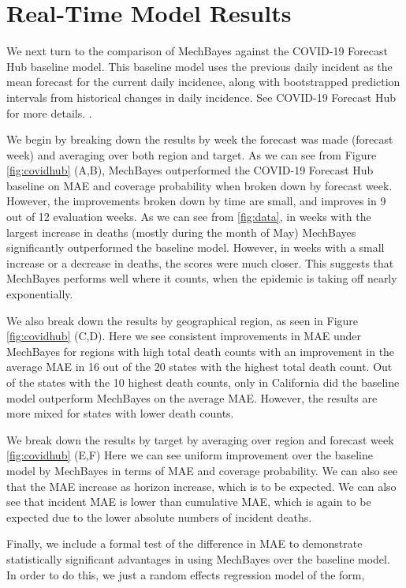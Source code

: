 \documentclass{umassthesis}          %
\begin{document}
\section{Real-Time Model Results}

We next turn to the comparison of MechBayes against the COVID-19 Forecast Hub baseline model. This baseline model uses the previous daily incident as the mean forecast for the current daily incidence, along with  bootstrapped prediction intervals from historical changes in daily incidence. See COVID-19 Forecast Hub for more details. \cite{covidhub}. 

We begin by breaking down the results by week the forecast was made (forecast week) and averaging over both region and target. As we can see from Figure \ref{fig:covidhub} (A,B), MechBayes outperformed the COVID-19 Forecast Hub baseline on MAE and coverage probability when broken down by forecast week. However, the improvements broken down by time are small, and improves in 9 out of 12 evaluation weeks.  As we can see from \ref{fig:data}, in weeks with the largest increase in deaths (mostly during the month of May) MechBayes significantly outperformed the baseline model. However, in weeks with a small increase or a decrease in deaths, the scores were much closer. This suggests that MechBayes performs well where it counts, when the epidemic is taking off nearly exponentially. 

We also break down the results by geographical region, as seen in Figure \ref{fig:covidhub} (C,D). Here we see consistent improvements in MAE under MechBayes for regions with high total death counts with an improvement in the average MAE in 16 out of the 20 states with the highest total death count. Out of the states with the 10 highest death counts, only in California did the baseline model outperform MechBayes on the average MAE. However, the results are more mixed for states with lower death counts.

We break down the results by target by averaging over region and forecast week  \ref{fig:covidhub} (E,F) Here we can see uniform improvement over the baseline model by MechBayes in terms of MAE and coverage probability. We can also see that the MAE increase as horizon increase, which is to be expected. We can also see that incident MAE is lower than cumulative MAE, which is again to be expected due to the lower absolute numbers of incident deaths. 

Finally, we include a formal test of the difference in MAE to demonstrate statistically significant advantages in using MechBayes over the baseline model. In order to do this, we just a random effects regression model of the form,
\end{document}

